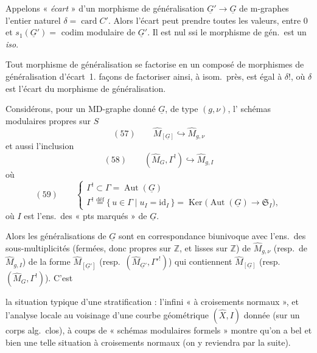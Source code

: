 \documentclass[11pt,a4paper]{article}
\begin{document}
Appelons « \emph{écart} » d'un morphisme de généralisation $\underline{G}' \to \underline{G}$ de m-graphes l'entier naturel $\delta = \operatorname{card} C'$. Alors l'écart    peut prendre toutes les valeurs, entre $0$ et $s_1(\underline{G}') =$ codim modulaire de $\underline{G}'$. Il est nul ssi le morphisme de gén.\ est un \emph{iso}.

Tout morphisme de généralisation se factorise en un composé de morphismes de généralisation d'écart~1.   façons de factoriser ainsi, à isom.\ près, est égal à $\delta!$, où $\delta$ est l'écart du morphisme de généralisation.

Considérons, pour un MD-graphe donné $\underline{G}$, de type  $(g, \nu)$, l'  schémas modulaires propres sur $S$
\[
(57)\qquad \widehat{M}_{[\underline{G}]} \hookrightarrow \widehat{M}_{g,\nu}
\]
et aussi l'inclusion
\[
(58)\qquad (\widehat{M}_G, \Gamma^{!}) \hookrightarrow \widehat{M}_{g,I}
\]
où
\[
(59)\qquad
\left\{
\begin{array}{l}
\Gamma^{!} \subset \Gamma = \operatorname{Aut}(\underline{G}) \\[2pt]
\Gamma^{!} \overset{\text{déf}}{=} \{\, u \in \Gamma \mid u_I = \mathrm{id}_I \,\} = \operatorname{Ker}\bigl(\operatorname{Aut}(\underline{G}) \to \mathfrak{S}_I\bigr),
\end{array}
\right.
\]
où $I$ est l'ens.\ des « pts marqués » de $\underline{G}$.

Alors les  généralisations de $\underline{G}$ sont en correspondance biunivoque avec l'ens.\ des sous-multiplicités (fermées, \struck{\ill{}} donc propres sur $\mathbb{Z}$, et lisses sur $\mathbb{Z}$) de $\widehat{M}_{g,\nu}$ (resp.\ de $\widehat{M}_{g,I}$) de la forme $\widehat{M}_{[\underline{G}']}$ (resp.\ $(\widehat{M}_{\underline{G}'}, \Gamma'^{!})$) qui contiennent $\widehat{M}_{[\underline{G}]}$ (resp.\ $(\widehat{M}_G, \Gamma^{!})$). C'est

la situation typique d'une stratification : l'infini « à croisements normaux », et l'analyse locale au voisinage d'une courbe géométrique $(\hat{X}, I)$ donnée (sur un corps alg.\ clos), à coups de « schémas modulaires  formels » montre qu'on a bel et bien une telle situation à croisements normaux (on y reviendra par la suite).
\end{document}
